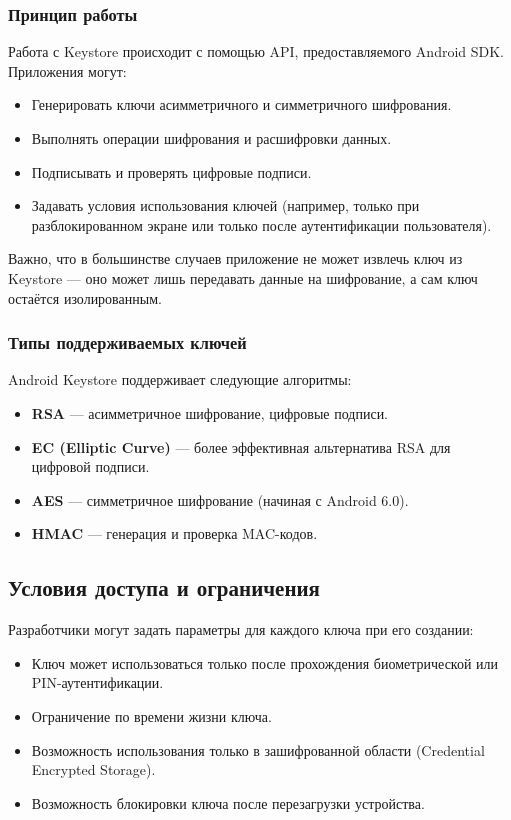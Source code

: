 \subsubsection*{Принцип работы}

Работа с Keystore происходит с помощью API, предоставляемого Android SDK.
Приложения могут:

\begin{itemize}
    \item Генерировать ключи асимметричного и симметричного шифрования.
    \item Выполнять операции шифрования и расшифровки данных.
    \item Подписывать и проверять цифровые подписи.
    \item Задавать условия использования ключей (например, только при разблокированном экране или только после аутентификации пользователя).
\end{itemize}

Важно, что в большинстве случаев приложение не может извлечь ключ из Keystore
--- оно может лишь передавать данные на шифрование, а сам ключ остаётся
изолированным.

\subsubsection*{Типы поддерживаемых ключей}

Android Keystore поддерживает следующие алгоритмы:

\begin{itemize}
    \item \textbf{RSA} --- асимметричное шифрование, цифровые подписи.
    \item \textbf{EC (Elliptic Curve)} --- более эффективная альтернатива RSA для цифровой подписи.
    \item \textbf{AES} --- симметричное шифрование (начиная с Android 6.0).
    \item \textbf{HMAC} --- генерация и проверка MAC-кодов.
\end{itemize}

\subsection{Условия доступа и ограничения}

Разработчики могут задать параметры для каждого ключа при его создании:

\begin{itemize}
    \item Ключ может использоваться только после прохождения биометрической или PIN-аутентификации.
    \item Ограничение по времени жизни ключа.
    \item Возможность использования только в зашифрованной области (Credential Encrypted Storage).
    \item Возможность блокировки ключа после перезагрузки устройства.
\end{itemize}

